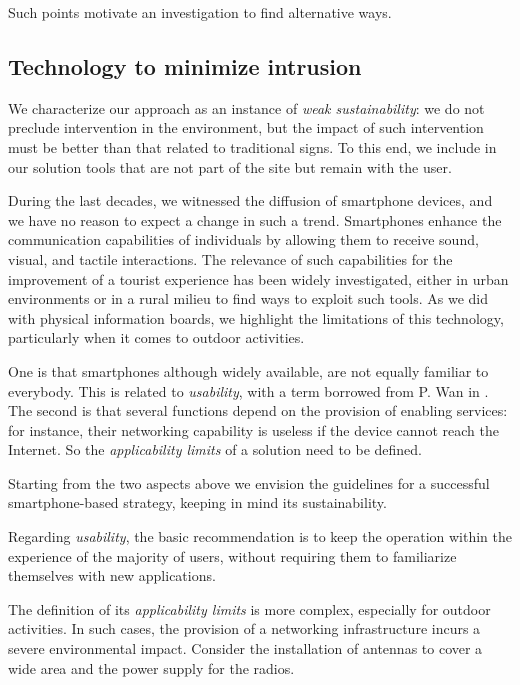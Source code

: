 \documentclass[sustainability,article,submit,pdftex,moreauthors]{Definitions/mdpi}
\begin{document}
Such points motivate an investigation to find alternative ways.

\subsection{Technology to minimize intrusion \label{sec:minimize}}

We characterize our approach as an instance of {\em weak sustainability}: we do not preclude intervention in the environment, but the impact of such intervention must be better than that related to traditional signs. To this end, we include in our solution tools that are not part of the site but remain with the user.   

During the last decades, we witnessed the diffusion of smartphone devices, and we have no reason to expect a change in such a trend. Smartphones enhance the communication capabilities of individuals by allowing them to receive sound, visual, and tactile interactions. The relevance of such capabilities for the improvement of a tourist experience has been widely investigated, either in urban environments \cite{liu16a} or in a rural milieu \cite{kum20a} to find ways to exploit such tools. As we did with physical information boards, we highlight the limitations of this technology, particularly when it comes to outdoor activities.

One is that smartphones although widely available, are not equally familiar to everybody. This is related to {\em usability}, with a term borrowed from P. Wan in \cite{wan22a}. The second is that several functions depend on the provision of enabling services: for instance, their networking capability is useless if the device cannot reach the Internet. So the {\em applicability limits} of a solution need to be defined.

Starting from the two aspects above we envision the guidelines for a successful smartphone-based strategy, keeping in mind its sustainability.

Regarding \textit{usability}, the basic recommendation is to keep the operation within the experience of the majority of users, without requiring them to familiarize themselves with new applications.

The definition of its {\em applicability limits} is more complex, especially for outdoor activities. In such cases, the provision of a networking infrastructure incurs a severe environmental impact. Consider the installation of antennas to cover a wide area and the power supply for the radios. 
\end{document}
